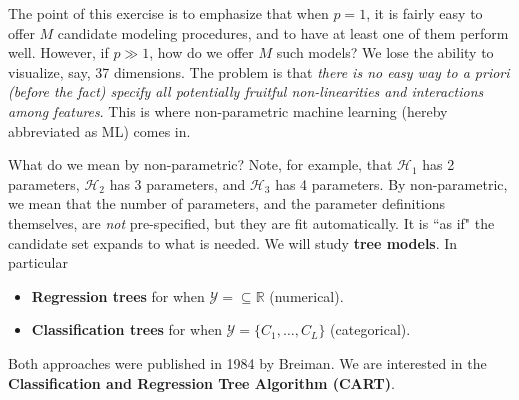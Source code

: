 \documentclass[12pt, a4paper]{article}
\theoremstyle{definition}
\begin{document}
	The point of this exercise is to emphasize that when $p = 1$, it is fairly easy
	to offer $M$ candidate modeling procedures, and to have at least one of them perform
	well. However, if $p \gg 1$, how do we offer $M$ such models? We lose the ability
	to visualize, say, 37 dimensions. The problem is that \textit{there is no easy
	way to a priori (before the fact) specify all potentially fruitful non-linearities
	and interactions among features}. This is where non-parametric machine learning
	(hereby abbreviated as ML) comes in.
	
	What do we mean by non-parametric? Note, for example, that $\mathcal{H}_1$
	has 2 parameters, $\mathcal{H}_2$ has 3 parameters, and $\mathcal{H}_3$ has
	4 parameters. By non-parametric, we mean that the number of parameters, and
	the parameter definitions themselves, are \textit{not} pre-specified,
	but they are fit automatically. It is ``as if" the candidate set expands
	to what is needed. We will study \textbf{tree models}. In particular
	\begin{itemize}
		\item \textbf{Regression trees} for when $\mathcal{Y} = \subseteq \mathbb{R}$ (numerical).
		\item \textbf{Classification trees} for when $\mathcal{Y} = \{C_1, \ldots, C_L\}$
		(categorical).
	\end{itemize}
	Both approaches were published in 1984 by Breiman. We are interested in
	the \textbf{Classification and Regression Tree Algorithm (CART)}.
\end{document}
